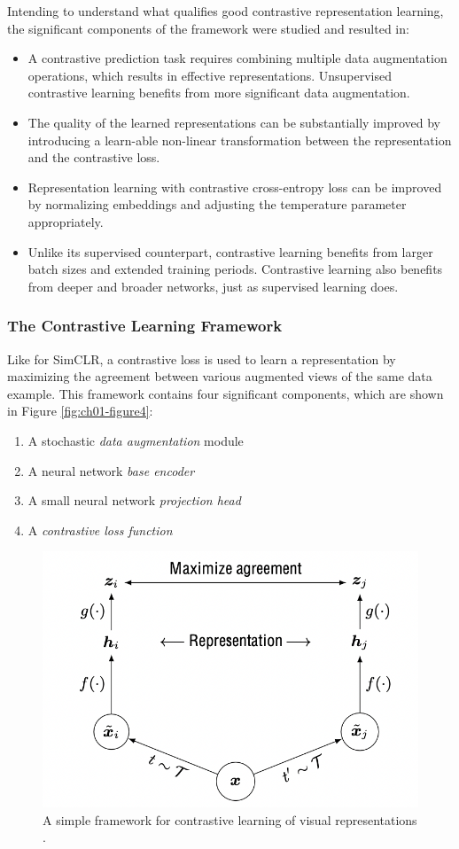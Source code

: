 \documentclass[
]{krantz}
\providecommand{\tightlist}{%
  \setlength{\itemsep}{0pt}\setlength{\parskip}{0pt}}
\begin{document}
Intending to understand what qualifies good contrastive representation learning, the significant components of the framework were studied and resulted in:

\begin{itemize}
\tightlist
\item
  A contrastive prediction task requires combining multiple data augmentation operations, which results in effective representations. Unsupervised contrastive learning benefits from more significant data augmentation.
\item
  The quality of the learned representations can be substantially improved by introducing a learn-able non-linear transformation between the representation and the contrastive loss.
\item
  Representation learning with contrastive cross-entropy loss can be improved by normalizing embeddings and adjusting the temperature parameter appropriately.
\item
  Unlike its supervised counterpart, contrastive learning benefits from larger batch sizes and extended training periods. Contrastive learning also benefits from deeper and broader networks, just as supervised learning does.
\end{itemize}

\hypertarget{the-contrastive-learning-framework}{%
\subsubsection{The Contrastive Learning Framework}\label{the-contrastive-learning-framework}}

Like for SimCLR, a contrastive loss is used to learn a representation by maximizing the agreement between various augmented views of the same data example. This framework contains four significant components, which are shown in Figure \ref{fig:ch01-figure4}:

\begin{enumerate}
\def\labelenumi{\arabic{enumi}.}
\tightlist
\item
  A stochastic \emph{data augmentation} module
\item
  A neural network \emph{base encoder}
\item
  A small neural network \emph{projection head}
\item
  A \emph{contrastive loss function}
\end{enumerate}

\begin{figure}

{\centering \includegraphics[width=0.3\linewidth]{./figures/01-chapter1/SimCLR} 

}

\caption{A simple framework for contrastive learning of visual representations \citep{SimCLR}.}\label{fig:ch01-figure04}
\end{figure}
\end{document}
